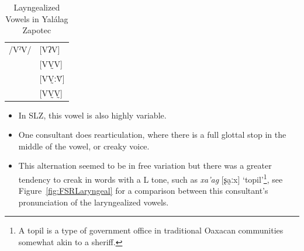 \documentclass[12pt, letterpaper]{article}
\providecommand{\lsptoprule}{\midrule\toprule}
\providecommand{\lspbottomrule}{\bottomrule\midrule}
\begin{document}
\begin{table}[!h]
	\centering
	\caption{Layngealized Vowels in Yalálag Zapotec}
	\label{tab:laryngeal}
	 \begin{tabular}{ll}
	\lsptoprule
	/VˀV/	&  [VʔV]  \\
			&  [VV̰V]   \\
			&  [VV̰ːV̆]  \\
			&  [VV̰V̰]	\\
	\lspbottomrule
	\end{tabular}
\end{table}

\begin{itemize}
	\item In SLZ, this vowel is also highly variable.
	\item One consultant does rearticulation, where there is a full glottal stop in the middle of the vowel, or creaky voice. 
	\item This alternation seemed to be in free variation but there was a greater tendency to creak in words with a L tone, such as \textit{xa'ag} [ʂa̰ːx] `topil'\footnote{A topil is a type of government office in traditional Oaxacan communities somewhat akin to a sheriff. }, see Figure~\ref{fig:FSRLaryngeal} for a comparison between this consultant's pronunciation of the laryngealized vowels.
\end{itemize}
\end{document}
